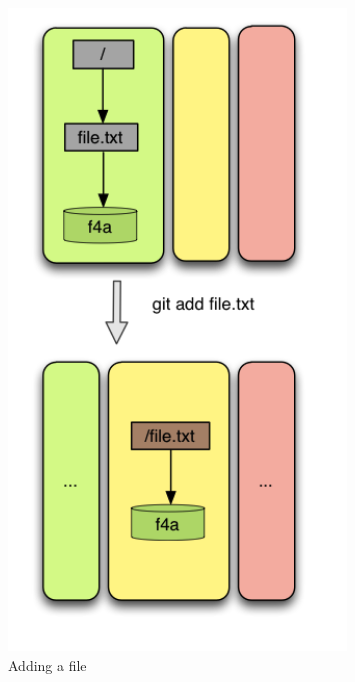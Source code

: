 \begin{figure}[tp]
   \begin{minipage}[b]{0.5\linewidth}
      \centering
      \includegraphics[width=0.8\textwidth]{images/add1.png}
      \caption{Adding a file}\label{fig:add1}
   \end{minipage}
   \begin{minipage}[b]{0.5\linewidth}
      \centering 

\end{minipage}
\end{figure}
